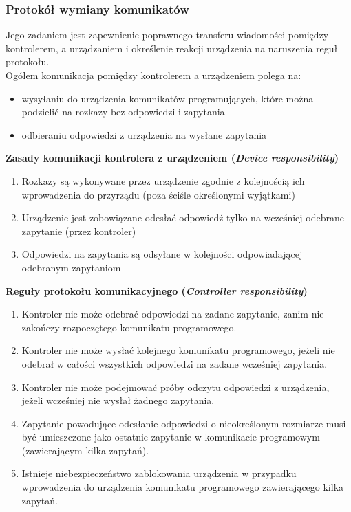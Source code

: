 \subsubsection{Protokół wymiany komunikatów}
Jego zadaniem jest zapewnienie poprawnego transferu wiadomości pomiędzy kontrolerem, a urządzaniem i określenie reakcji urządzenia na naruszenia reguł protokołu.\\
Ogółem komunikacja pomiędzy kontrolerem a urządzeniem polega na:
\begin{itemize}
	\item wysyłaniu do urządzenia komunikatów programujących, które można podzielić na rozkazy bez odpowiedzi i zapytania
	\item odbieraniu odpowiedzi z urządzenia na wysłane zapytania
\end{itemize}
\textbf{Zasady komunikacji kontrolera z urządzeniem (\emph{Device responsibility})}
\begin{enumerate}
	\item Rozkazy są wykonywane przez urządzenie zgodnie z kolejnością ich wprowadzenia do przyrządu (poza ściśle określonymi wyjątkami)
	\item Urządzenie jest zobowiązane odesłać odpowiedź tylko na wcześniej odebrane zapytanie (przez kontroler)
	\item Odpowiedzi na zapytania są odsyłane w kolejności odpowiadającej odebranym zapytaniom
\end{enumerate}
\textbf{Reguły protokołu komunikacyjnego (\emph{Controller responsibility})}
\begin{enumerate}
	\item Kontroler nie może odebrać odpowiedzi na zadane zapytanie, zanim nie zakończy rozpoczętego komunikatu programowego.
	\item Kontroler nie może wysłać kolejnego komunikatu programowego, jeżeli nie odebrał w całości wszystkich odpowiedzi na zadane wcześniej zapytania.
	\item Kontroler nie może podejmować próby odczytu odpowiedzi z urządzenia, jeżeli wcześniej nie wysłał żadnego zapytania.
	\item Zapytanie powodujące odesłanie odpowiedzi o nieokreślonym rozmiarze musi być umieszczone jako ostatnie zapytanie w komunikacie programowym (zawierającym kilka zapytań).
	\item Istnieje niebezpieczeństwo zablokowania urządzenia w przypadku wprowadzenia do urządzenia komunikatu programowego zawierającego kilka zapytań.
\end{enumerate}


